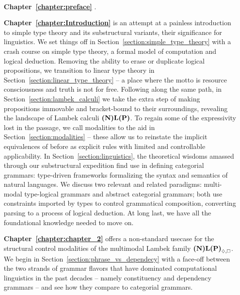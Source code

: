 {\paragraph{}
\begin{enumerate}[labelindent=2pt, itemindent=30pt, labelsep=5pt, widest=Chapter III,align=right,itemsep=5pt]
\item[\textbf{Chapter~\ref{chapter:preface}}] .
\item[\textbf{Chapter~\ref{chapter:Introduction}}] is an attempt at a painless introduction to simple type theory and its substructural variants,  their significance for linguistics.
We set things off in Section~\ref{section:simple_type_theory} with a crash course on simple type theory, a formal model of computation and logical deduction.
Removing the ability to erase or duplicate logical propositions, we transition to linear type theory in Section~\ref{section:linear_type_theory} -- a place where the motto is resource consciousness and truth is not for free.
Following along the same path, in Section~\ref{section:lambek_calculi} we take the extra step of making propositions immovable and bracket-bound to their surroundings, revealing the landscape of Lambek calculi $\textbf{(N)L(P)}$.
To regain some of the expressivity lost in the passage, we call modalities to the aid in Section~\ref{section:modalities} -- these allow us to reinstate the implicit equivalences of before as explicit rules with limited and controllable applicability.
In Section~\ref{section:linguistics}, the theoretical wisdoms amassed through our substructural expedition find use in defining categorial grammars: type-driven frameworks formalizing the syntax and semantics of natural languages.
We discuss two relevant and related paradigms: multi-modal type-logical grammars and abstract categorial grammars; both use constraints imported by types to control grammatical composition, converting parsing to a process of logical deduction.
At long last, we have all the foundational knowledge needed to move on.
\item[\textbf{Chapter~\ref{chapter:chapter_2}}] offers a non-standard usecase for the structural control modalities of the multimodal Lambek family $\logic{(N)L(P)}_{\diamond, \bx}$.
We begin in Section~\ref{section:phrase_vs_dependecy} with a face-off between the two strands of grammar flavors that have dominated computational linguistics in the past decades -- namely constituency  and dependency grammars -- and see how they compare to categorial grammars.

\end{enumerate}}
